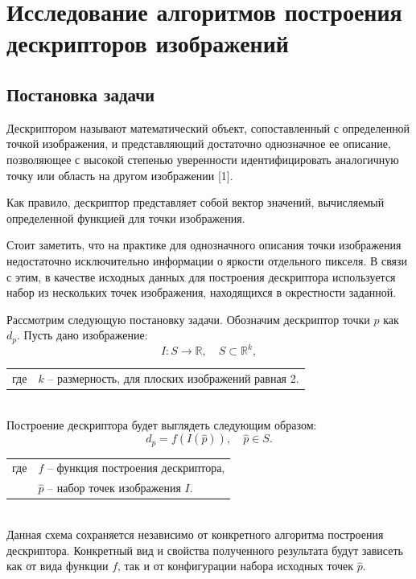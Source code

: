 \section{Исследование алгоритмов построения дескрипторов изображений}
{
\subsection{Постановка задачи}{
	Дескриптором называют математический объект, сопоставленный с определенной точкой изображения, и представляющий достаточно однозначное ее описание, позволяющее с высокой степенью уверенности идентифицировать аналогичную точку или область на другом изображении [1]. 
	
	Как правило, дескриптор представляет собой вектор значений, вычисляемый определенной функцией для точки изображения.
	
	Стоит заметить, что на практике для однозначного описания точки изображения недостаточно исключительно информации о яркости отдельного пикселя. В связи с этим, в качестве исходных данных для построения дескриптора используется набор из нескольких точек изображения, находящихся в окрестности заданной.  
	
	Рассмотрим следующую постановку задачи.
	Обозначим дескриптор точки $p$ как $d_p$.
	Пусть дано изображение:
	\begin{equation}\label{problem_images}
	I : S \rightarrow \mathbb{R}, \quad S \subset \mathbb{R}^k,
	\end{equation}
	   	\begin{tabular}{ rl }
	  	 \quad \quad где 
	   	& $k$ -- размерность, для плоских изображений равная 2.
	   	\end{tabular}\\
   
	Построение дескриптора будет выглядеть следующим образом:
	\begin{equation}\label{problem_transform}
	d_p = f(I(\hat{p})), \quad \hat{p} \in S.
	\end{equation} 
	   	\begin{tabular}{ rl }
	   	\quad \quad где 
	   	& $f$ -- функция построения дескриптора, \\
	   	& $\hat{p}$ -- набор точек изображения $I$.
	\end{tabular}\\

	Данная схема сохраняется независимо от конкретного алгоритма построения дескриптора. Конкретный вид и свойства полученного результата будут зависеть как от вида функции $f$, так и от конфигурации набора исходных точек $\hat{p}$.
 
}}
